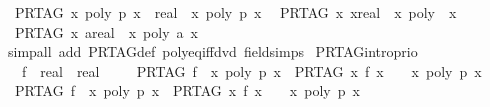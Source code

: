 \begin{isabellebody}
\ \ {\isachardoublequoteopen}PR{\isacharunderscore}TAG\ {\isacharparenleft}{\isasymlambda}x{\isachardot}\ poly\ p\ x\ {\isacharcolon}{\isacharcolon}\ real{\isacharparenright}\ {\isacharequal}\ {\isacharparenleft}{\isasymlambda}x{\isachardot}\ poly\ p\ x{\isacharparenright}{\isachardoublequoteclose}\isanewline
\ \ {\isachardoublequoteopen}PR{\isacharunderscore}TAG\ {\isacharparenleft}{\isasymlambda}x{\isachardot}\ x{\isacharcolon}{\isacharcolon}real{\isacharparenright}\ {\isacharequal}\ {\isacharparenleft}{\isasymlambda}x{\isachardot}\ poly\ {\isacharbrackleft}{\isacharcolon}{}{\isacharcomma}{}{\isacharcolon}{\isacharbrackright}\ x{\isacharparenright}{\isachardoublequoteclose}\isanewline
\ \ {\isachardoublequoteopen}PR{\isacharunderscore}TAG\ {\isacharparenleft}{\isasymlambda}x{\isachardot}\ a{\isacharcolon}{\isacharcolon}real{\isacharparenright}\ {\isacharequal}\ {\isacharparenleft}{\isasymlambda}x{\isachardot}\ poly\ {\isacharbrackleft}{\isacharcolon}a{\isacharcolon}{\isacharbrackright}\ x{\isacharparenright}{\isachardoublequoteclose}\isanewline
%
\isadelimproof
\ \ %
\endisadelimproof
%
\isatagproof
{}\isamarkupfalse%
\ {\isacharparenleft}simp{\isacharunderscore}all\ add{\isacharcolon}\ PR{\isacharunderscore}TAG{\isacharunderscore}def\ poly{\isacharunderscore}eq{\isacharunderscore}{}{\isacharunderscore}iff{\isacharunderscore}dvd\ field{\isacharunderscore}simps{\isacharparenright}%
\endisatagproof
{\isafoldproof}%
%
\isadelimproof
\isanewline
%
\endisadelimproof
\isanewline
\isanewline
{}\isamarkupfalse%
\ PR{\isacharunderscore}TAG{\isacharunderscore}intro{\isacharunderscore}prio{}{\isacharcolon}\isanewline
\ \ \ f\ {\isacharcolon}{\isacharcolon}\ {\isachardoublequoteopen}real\ {\isasymRightarrow}\ real{\isachardoublequoteclose}\isanewline
\ \ \isanewline
\ \ {\isachardoublequoteopen}PR{\isacharunderscore}TAG\ f\ {\isacharequal}\ {\isacharparenleft}{\isasymlambda}x{\isachardot}\ poly\ p\ x{\isacharparenright}\ {\isasymLongrightarrow}\ PR{\isacharunderscore}TAG\ {\isacharparenleft}{\isasymlambda}x{\isachardot}\ f\ x\ {\isacharequal}\ {}{\isacharparenright}\ {\isacharequal}\ {\isacharparenleft}{\isasymlambda}x{\isachardot}\ poly\ p\ x\ {\isacharequal}\ {}{\isacharparenright}{\isachardoublequoteclose}\isanewline
\ \ {\isachardoublequoteopen}PR{\isacharunderscore}TAG\ f\ {\isacharequal}\ {\isacharparenleft}{\isasymlambda}x{\isachardot}\ poly\ p\ x{\isacharparenright}\ {\isasymLongrightarrow}\ PR{\isacharunderscore}TAG\ {\isacharparenleft}{\isasymlambda}x{\isachardot}\ f\ x\ {\isasymnoteq}\ {}{\isacharparenright}\ {\isacharequal}\ {\isacharparenleft}{\isasymlambda}x{\isachardot}\ poly\ p\ x\ {\isasymnoteq}\ {}{\isacharparenright}{\isachardoublequoteclose}\isanewline

\end{isabellebody}
